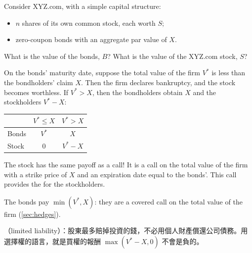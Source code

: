 
Consider XYZ.com, with a simple capital structure:
\begin{itemize}[nosep]
	\item $n$ shares of its own common stock, each worth $S$;
	\item zero-coupon bonds with an aggregate par value of $X$.
\end{itemize}
What is the value of the bonds, $B$?
What is the value of the XYZ.com stock, $S$?

\suppstart
{}
\suppend

On the bonds' maturity date, suppose the total value of the firm $V^{*}$ is less than the bondholders' claim $X$.
Then the firm declares bankruptcy, and the stock becomes worthless.
If $V^{*}>X$, then the bondholders obtain $X$ and the stockholders $V^{*}-X$:
\begin{center}
	\begin{tabular}{lcc}
		\toprule
		      & $V^{*}\le X$ & $V^{*}>X$ \\
		\midrule
		Bonds & $V^{*}$      & $X$       \\
		Stock & $0$          & $V^{*}-X$ \\
		\bottomrule
	\end{tabular}
\end{center}

\suppstart
{}
\suppend

\begin{moral}
	The stock has the same payoff as a call!
	It is a call on the total value of the firm with a strike price of $X$ and an expiration date equal to the bonds'.
	This call provides the  for the stockholders.

	The bonds pay $\min(V^{*},X)$: they are a covered call on the total value of the firm (\autoref{sec:hedges}).
\end{moral}

\suppstart
{}

\begin{remark}
	（limited liability）：股東最多賠掉投資的錢，不必用個人財產償還公司債務。用選擇權的語言，就是買權的報酬 $\max(V^{*}-X,0)$ 不會是負的。
\end{remark}
\suppend

